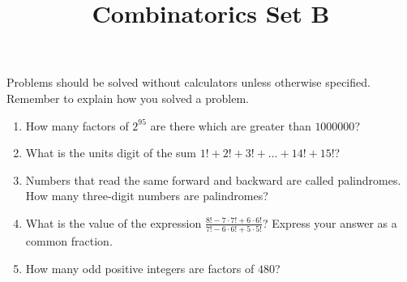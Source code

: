 \documentclass{article}
\title{Combinatorics Set B}
\author{}
\date{}
\begin{document}
\maketitle
\noindent Problems should be solved without calculators unless otherwise 
specified. Remember to explain how you solved a problem.
\begin{enumerate}
    \item How many factors of $2^{95}$ are there which are greater than 
        $\num{1000000}$?
        \vspace{3cm}
    \item What is the units digit of the sum $1! + 2! + 3! + \dots + 14! + 15!$?
        \vspace{3cm}
    \item Numbers that read the same forward and backward are called 
        palindromes. How many three-digit numbers are palindromes?
        \vspace{3cm}
    \item What is the value of the expression $\frac{8! - 7 \cdot 7! + 6 \cdot 
        6!}{7! - 6 \cdot 6! + 5 \cdot 5!}$? Express your answer as a common 
        fraction.
        \vspace{3cm}
    \item How many odd positive integers are factors of $480$?
        \vspace{3cm}
\end{enumerate}
\end{document}
